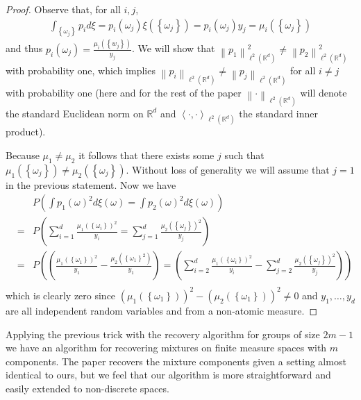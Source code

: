 \documentclass[aos,preprint]{imsart}
\def\rn{\mathbb{R}}
\def\l{\left}
\def\r{\right}
\def\lrd{{\ell^2\left( \rn^d \right)}}
\theoremstyle{plain}
\theoremstyle{defintion}
\begin{document}
\begin{proof}
	Observe that, for all $i,j$,
	\begin{eqnarray*}
		\int_{\left\{ \omega_j \right\}} p_i d\xi 
		= p_i(\omega_j)\xi\left( \left\{ \omega_j \right\} \right) 
		= p_i(\omega_j) y_j
		= \mu_i\left( \left\{ \omega_j \right\} \right)
	\end{eqnarray*}
	and thus $p_i\left( \omega_j \right) = \frac{\mu_i\left( \left\{ w_j \right\} \right)}{y_j}$. We will show that $\l\|p_1\r\|_{\lrd}^2 \neq \l\|p_2\r\|_{\lrd}^2$ with probability one, which implies $\l\|p_i\r\|_{\lrd} \neq \l\|p_j\r\|_{\lrd}$ for all $i\neq j$ with probability one (here and for the rest of the paper $\l\|\cdot \r\|_\lrd$ will denote the standard Euclidean norm on $\rn^d$ and $\l<\cdot,\cdot\r>_\lrd$ the standard inner product).

	Because $\mu_1 \neq \mu_2$ it follows that there exists some $j$ such that $\mu_1\left( \l\{\omega_j\r\} \right) \neq \mu_2\left( \left\{ \omega_j \right\} \right)$. Without loss of generality we will assume that $j=1$ in the previous statement. Now we have \small
	\begin{eqnarray*}
		&&P\left( \int p_1\left( \omega \right)^2 d\xi\left( \omega \right) = \int p_2\left( \omega \right)^2 d\xi\left( \omega \right) \right)\\
                &=& P\left( \sum_{i=1}^d \frac{\mu_1\left( \l\{\omega_i\r\} \right)^2}{y_i} = \sum_{j=1}^d \frac{\mu_2\left( \l\{\omega_j\r\} \right)^2}{y_j} \right)\\
                &=& P\left(\l( \frac{ \mu_1\left( \l\{\omega_1\r\} \right)^2}{y_1}-  \frac{ \mu_2\left( \l\{\omega_1\r\}^2 \right)}{y_1}\r) = \l(\sum_{i=2}^d \frac{\mu_1\left( \l\{\omega_i\r\} \right)^2}{y_i} - \sum_{j=2}^d \frac{\mu_2\left( \l\{\omega_j\r\} \right)^2}{y_j}\r) \right)\\
	\end{eqnarray*}
	\normalsize
        which is clearly zero since $\left( \mu_1\left( \l\{\omega_1\r\} \right) \right)^2 - \left( \mu_2\left( \l\{\omega_1\r\} \right) \right)^2 \neq 0$ and $y_1,\ldots, y_d$ are all independent random variables and from a non-atomic measure.
\end{proof}

Applying the previous trick with the recovery algorithm for groups of size $2m-1$ we have an algorithm for recovering mixtures on finite measure spaces with $m$ components. The paper \cite{rabani14} recovers the mixture components given a setting almost identical to ours, but we feel that our algorithm is more straightforward and easily extended to non-discrete spaces.
\end{document}
